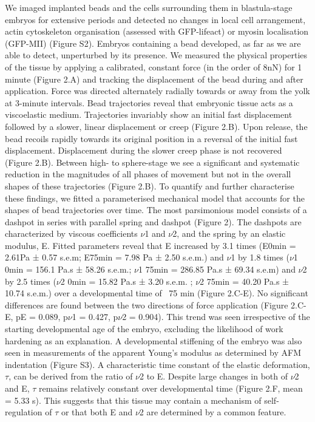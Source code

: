 We imaged implanted beads and the cells surrounding them in blastula-stage embryos for extensive periods and detected no changes in local cell arrangement, actin cytoskeleton organisation (assessed with GFP-lifeact) or myosin localisation (GFP-MII) (Figure S2).
Embryos containing a bead developed, as far as we are able to detect, unperturbed by its presence.
We measured the physical properties of the tissue by applying a calibrated, constant force (in the order of 8nN) for 1 minute (Figure 2.A) and tracking the displacement of the bead during and after application.
Force was directed alternately radially towards or away from the yolk at 3-minute intervals.
Bead trajectories reveal that embryonic tissue acts as a viscoelastic medium.
Trajectories invariably show an initial fast displacement followed by a slower, linear displacement or creep (Figure 2.B).
Upon release, the bead recoils rapidly towards its original position in a reversal of the initial fast displacement.
Displacement during the slower creep phase is not recovered (Figure 2.B).
Between high- to sphere-stage we see a significant and systematic reduction in the magnitudes of all phases of movement but not in the overall shapes of these trajectories (Figure 2.B).
To quantify and further characterise these findings, we fitted a parameterised mechanical model that accounts for the shapes of bead trajectories over time.
The most parsimonious model consists of a dashpot in series with parallel spring and dashpot (Figure 2).
The dashpots are characterized by viscous coefficients $\nu$1 and $\nu$2, and the spring by an elastic modulus, E.
Fitted parameters reveal that E increased by 3.1 times (E0min = 2.61Pa ± 0.57 s.e.m; E75min = 7.98 Pa ± 2.50 s.e.m.) and $\nu$1 by 1.8 times ($\nu$1 0min = 156.1 Pa.s ± 58.26 s.e.m.; $\nu$1 75min = 286.85  Pa.s ± 69.34 s.e.m) and $\nu$2 by 2.5 times ($\nu$2 0min = 15.82 Pa.s ± 3.20 s.e.m. ; $\nu$2 75min = 40.20 Pa.s ± 10.74 s.e.m.) over a developmental time of  ~75 min (Figure 2.C-E).
 No significant differences are found between the two directions of force application (Figure 2.C-E, pE = 0.089, p$\nu$1 = 0.427, p$\nu$2 = 0.904).
 This trend was seen irrespective of the starting developmental age of the embryo, excluding the likelihood of work hardening as an explanation.
 A developmental stiffening of the embryo was also seen in measurements of the apparent Young’s modulus as determined by AFM indentation (Figure S3).
 A characteristic time constant of the elastic deformation, $\tau$, can be derived from the ratio of $\nu$2 to E.
 Despite large changes in both of $\nu$2 and E, $\tau$ remains relatively constant over developmental time (Figure 2.F, mean = 5.33 s).
 This suggests that this tissue may contain a mechanism of self-regulation of $\tau$ or that both E and $\nu$2 are determined by a common feature.

